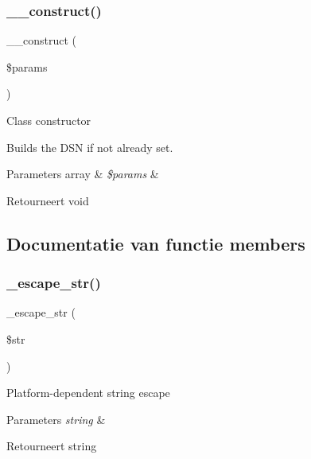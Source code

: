\subsubsection{\texorpdfstring{\_\_construct()}{\_\_construct()}}
{\footnotesize\ttfamily \+\_\+\+\_\+construct (\begin{DoxyParamCaption}\item[{}]{\$params }\end{DoxyParamCaption})}

Class constructor

Builds the D\+SN if not already set.


\begin{DoxyParams}[1]{Parameters}
array & {\em \$params} & \\
\hline
\end{DoxyParams}
\begin{DoxyReturn}{Retourneert}
void 
\end{DoxyReturn}


\subsection{Documentatie van functie members}
\mbox{\label{class_c_i___d_b__pdo__odbc__driver_af8ef0237bfcdb19215b63fff769e7a55}} 
\subsubsection{\texorpdfstring{\_escape\_str()}{\_escape\_str()}}
{\footnotesize\ttfamily \+\_\+escape\+\_\+str (\begin{DoxyParamCaption}\item[{}]{\$str }\end{DoxyParamCaption})\hspace{0.3cm}{\ttfamily [protected]}}

Platform-\/dependent string escape


\begin{DoxyParams}{Parameters}
{\em string} & \\
\hline
\end{DoxyParams}
\begin{DoxyReturn}{Retourneert}
string 
\end{DoxyReturn}
\mbox{\label{class_c_i___d_b__pdo__odbc__driver_a7ccb7f9c301fe7f0a9db701254142b63}} 
